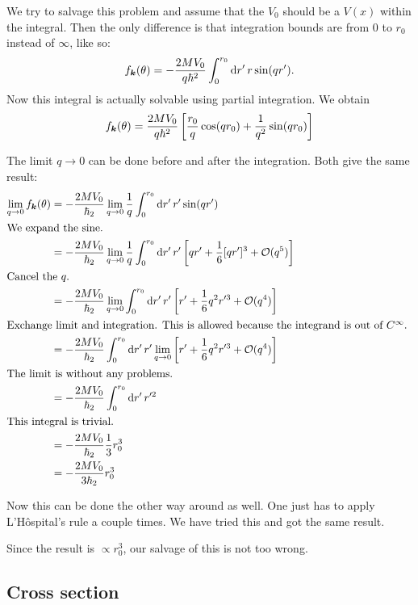 \documentclass[11pt, english, fleqn, DIV=15, headinclude, BCOR=1.5cm]{scrartcl}
\begin{document}
We try to salvage this problem and assume that the $V_0$ should be a $V(x)$
within the integral. Then the only difference is that integration bounds are
from 0 to $r_0$ instead of $\infty$, like so:
\[
    f_{\boldsymbol{k}}(\theta) = - \frac{2MV_0}{q \hbar^2} \int_0^{r_0} \mathop{}\!\mathrm d r' \, r
    \sin(qr').
\]
Now this integral is actually solvable using partial integration. We obtain
\[
    f_{\boldsymbol{k}}(\theta) = \frac{2MV_0}{q \hbar^2} \left[ 
        \frac{r_0}{q} \cos(qr_0) + \frac{1}{q^2} \sin(qr_0)
     \right]
\]

The limit $q \to 0$ can be done before and after the integration. Both give the
same result:
\begin{align*}
    \lim_{q \to 0} f_{\vec k}(\theta)
    &= - \frac{2MV_0}{\hbar_2} \lim_{q \to 0} \frac{1}{q} \int_0^{r_0} \dif r'
    \, r' \sin(q r') \\
    \intertext{%
        We expand the sine.
    }
    &= - \frac{2MV_0}{\hbar_2} \lim_{q \to 0} \frac{1}{q} \int_0^{r_0} \dif r'
    \, r' \sbr{q r' + \frac{1}{6} [qr']^3 + \mathcal O(q^5)} \\
    \intertext{%
        Cancel the $q$.
    }
    &= - \frac{2MV_0}{\hbar_2} \lim_{q \to 0} \int_0^{r_0} \dif r'
    \, r' \sbr{r' + \frac{1}{6} q^2 r'^3 + \mathcal O(q^4)} \\
    \intertext{%
        Exchange limit and integration. This is allowed because the integrand
        is out of $C^\infty$.
    }
    &= - \frac{2MV_0}{\hbar_2} \int_0^{r_0} \dif r'
    \, r' \lim_{q \to 0} \sbr{r' + \frac{1}{6} q^2 r'^3 + \mathcal O(q^4)} \\
    \intertext{%
        The limit is without any problems.
    }
    &= - \frac{2MV_0}{\hbar_2} \int_0^{r_0} \dif r' \, r'^2 \\
    \intertext{%
        This integral is trivial.
    }
    &= - \frac{2MV_0}{\hbar_2} \frac{1}{3} r_0^3 \\
    &= - \frac{2MV_0}{3\hbar_2} r_0^3
\end{align*}

Now this can be done the other way around as well. One just has to apply
L'Hôspital's rule a couple times. We have tried this and got the same result.

Since the result is $\propto r_0^3$, our salvage of this is not too wrong.

\subsection{Cross section}
\end{document}

